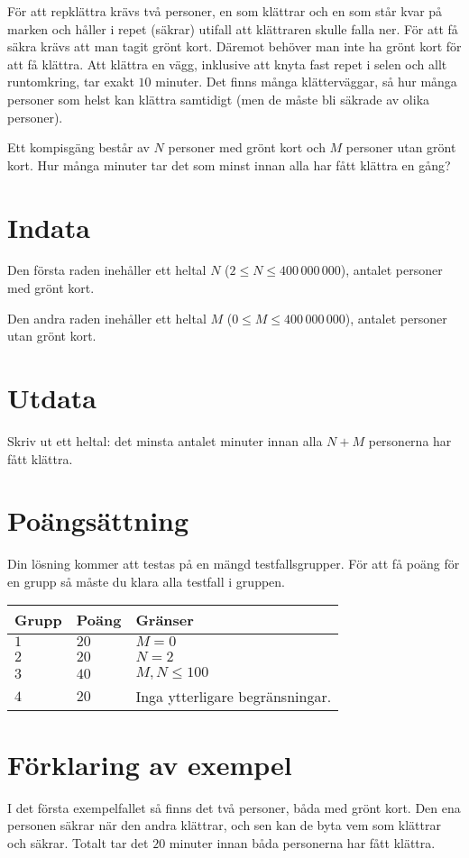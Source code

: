 För att repklättra krävs två personer, en som klättrar och en som står kvar på marken och håller i repet (säkrar) utifall att klättraren skulle falla ner.
För att få säkra krävs att man tagit grönt kort.
Däremot behöver man inte ha grönt kort för att få klättra.
Att klättra en vägg, inklusive att knyta fast repet i selen och allt runtomkring, tar exakt $10$ minuter.
Det finns många klätterväggar, så hur många personer som helst kan klättra samtidigt (men de måste bli säkrade av olika personer).

Ett kompisgäng består av $N$ personer med grönt kort och $M$ personer utan grönt kort. Hur många minuter tar det som minst innan alla har fått klättra en gång?

\section*{Indata}
Den första raden inehåller ett heltal $N$ ($2 \le N \le 400\,000\,000$), antalet personer med grönt kort.

Den andra raden inehåller ett heltal $M$ ($0 \le M \le 400\,000\,000$), antalet personer utan grönt kort.


\section*{Utdata}
Skriv ut ett heltal: det minsta antalet minuter innan alla $N+M$ personerna har fått klättra.

\section*{Poängsättning}
Din lösning kommer att testas på en mängd testfallsgrupper.
För att få poäng för en grupp så måste du klara alla testfall i gruppen.

\noindent
\begin{tabular}{| l | l | l |}
  \hline
  \textbf{Grupp} & \textbf{Poäng} & \textbf{Gränser} \\ \hline
  $1$   & $20$        & $M = 0$ \\ \hline
  $2$   & $20$        & $N = 2$ \\ \hline
  $3$   & $40$        & $M, N \le 100$ \\ \hline
  $4$   & $20$        & Inga ytterligare begränsningar. \\ \hline
\end{tabular}

\section*{Förklaring av exempel}
I det första exempelfallet så finns det två personer, båda med grönt kort.
Den ena personen säkrar när den andra klättrar, och sen kan de byta vem som klättrar och säkrar. 
Totalt tar det $20$ minuter innan båda personerna har fått klättra.

